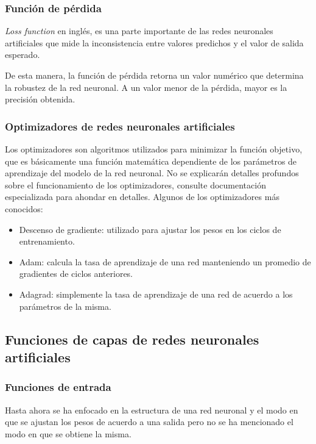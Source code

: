 \documentclass[a4paper,12pt,oneside,spanish]{book}
\begin{document}
\subsubsection{Función de pérdida}
\textit{Loss function} en inglés, es una parte importante de las redes neuronales artificiales que mide la inconsistencia entre valores predichos y el valor de salida esperado. \par

De esta manera, la función de pérdida retorna un valor numérico que determina la robustez de la red neuronal. A un valor menor de la pérdida, mayor es la precisión obtenida.\par

\subsubsection{Optimizadores de redes neuronales artificiales}
Los optimizadores son algoritmos utilizados para minimizar la función objetivo, que es básicamente una función matemática dependiente de los parámetros de aprendizaje del modelo de la red neuronal. No se explicarán detalles profundos sobre el funcionamiento de los optimizadores, consulte documentación especializada para ahondar en detalles. Algunos de los optimizadores más conocidos:

\begin{itemize}
	\item Descenso de gradiente: utilizado para ajustar los pesos en los ciclos de entrenamiento.
	\item Adam: calcula la tasa de aprendizaje de una red manteniendo un promedio de gradientes de ciclos anteriores.
	\item Adagrad: simplemente la tasa de aprendizaje de una red de acuerdo a los parámetros de la misma.
\end{itemize}

\subsection{Funciones de capas de redes neuronales artificiales}

\subsubsection{Funciones de entrada}
Hasta ahora se ha enfocado en la estructura de una red neuronal y el modo en que se ajustan los pesos de acuerdo a una salida pero no se ha mencionado el modo en que se obtiene la misma.\par
\end{document}
